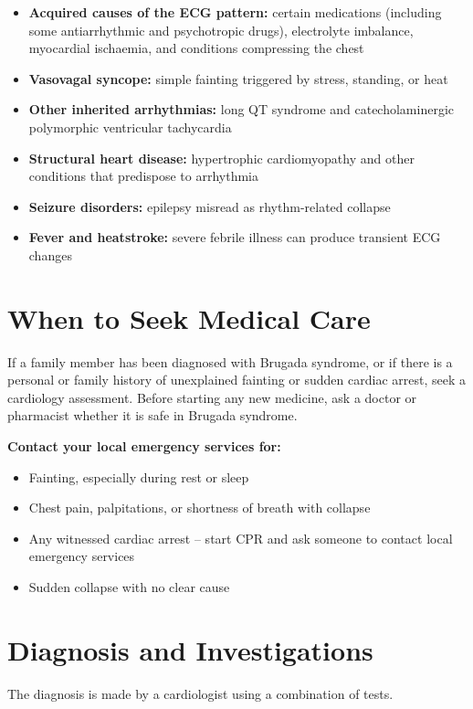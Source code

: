 \begin{itemize}
    \item \textbf{Acquired causes of the ECG pattern:} certain medications (including some antiarrhythmic and psychotropic drugs), electrolyte imbalance, myocardial ischaemia, and conditions compressing the chest
    \item \textbf{Vasovagal syncope:} simple fainting triggered by stress, standing, or heat
    \item \textbf{Other inherited arrhythmias:} long QT syndrome and catecholaminergic polymorphic ventricular tachycardia
    \item \textbf{Structural heart disease:} hypertrophic cardiomyopathy and other conditions that predispose to arrhythmia
    \item \textbf{Seizure disorders:} epilepsy misread as rhythm-related collapse
    \item \textbf{Fever and heatstroke:} severe febrile illness can produce transient ECG changes
\end{itemize}

\section*{When to Seek Medical Care}
If a family member has been diagnosed with Brugada syndrome, or if there is a personal or family history of unexplained fainting or sudden cardiac arrest, seek a cardiology assessment. Before starting any new medicine, ask a doctor or pharmacist whether it is safe in Brugada syndrome.

\textbf{Contact your local emergency services for:}
\begin{itemize}
    \item Fainting, especially during rest or sleep
    \item Chest pain, palpitations, or shortness of breath with collapse
    \item Any witnessed cardiac arrest -- start CPR and ask someone to contact local emergency services
    \item Sudden collapse with no clear cause
\end{itemize}

\section*{Diagnosis and Investigations}
The diagnosis is made by a cardiologist using a combination of tests.


